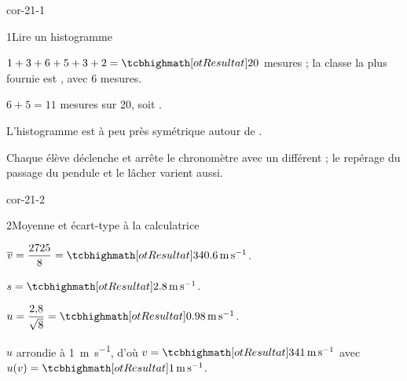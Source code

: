 \corrigesSouples

\begin{blocLivre}{cor-21-1}
\begin{corrige}{1}{Lire un histogramme}
\begin{questions}
\item $1+3+6+5+3+2=\res{20}$ mesures ; la classe la plus fournie est \res{\text{[\qty{1,42}{s} ; \qty{1,44}{s}[}}, avec 6 mesures.
\item $6+5=11$ mesures sur 20, soit .
\item L'histogramme est à peu près symétrique autour de .
\item Chaque élève déclenche et arrête le chronomètre avec un  différent ; le repérage du passage du pendule
et le lâcher varient aussi.
\end{questions}
\end{corrige}
\end{blocLivre}
\begin{blocLivre}{cor-21-2}
\begin{corrige}{2}{Moyenne et écart-type à la calculatrice}
\begin{questions}
\item $\overline{v}=\dfrac{2725}{8}=\res{\qty{340,6}{m.s^{-1}}}$.
\item $s=\res{\qty{2,8}{m.s^{-1}}}$.
\item $u=\dfrac{2{,}8}{\sqrt{8}}=\res{\qty{0,98}{m.s^{-1}}}$.
\item $u$ arrondie à \qty{1}{m.s^{-1}}, d'où $v=\res{\qty{341}{m.s^{-1}}}$ avec $u(v)=\res{\qty{1}{m.s^{-1}}}$.
\end{questions}
\end{corrige}
\end{blocLivre}
